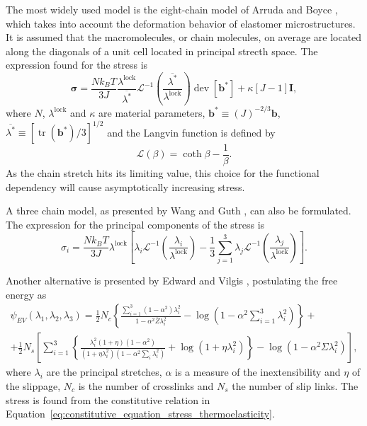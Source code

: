 The most widely used model is the eight-chain model of Arruda and Boyce \citep{arrudaEvolutionPlasticAnisotropy1993, arrudaEffectsStrainRate1995}, which takes into account the deformation behavior of elastomer microstructures.
It is assumed that the macromolecules, or chain molecules, on average are located along the diagonals of a unit cell located in principal strecth space.
The expression found for the stress is
\begin{equation}
	\label{eq:eigth_chain_model}
	\bm \sigma = \frac{Nk_BT}{3J} \frac{\lambda^\text{lock}}{\overline{\lambda^*}}\mathcal L^{-1}\left(\frac{\overline{\lambda^*}}{\lambda^\text{lock}}\right)\operatorname{dev} [\mathbf b^*] + \kappa [J-1]\mathbf I,
\end{equation}
where $N$, $\lambda^\text{lock}$ and $\kappa$ are material parameters, $\mathbf b^*\equiv (J)^{-2/3}\mathbf b$, $\overline{\lambda^*}\equiv [\operatorname{tr}(\mathbf b^*)/3]^{1/2}$ and the Langvin function is defined by
\begin{equation}
	\mathcal L(\beta) = \coth \beta - \frac{1}{\beta}.
\end{equation}
As the chain stretch hits its limiting value, this choice for the functional dependency will cause asymptotically increasing stress.

A three chain model, as presented by Wang and Guth \citep{wangStatisticalTheoryNetworks1952}, can also be formulated.
The expression for the principal components of the stress is
\begin{equation}
	\label{eq:three_chain_model}
	\sigma_i=\frac{Nk_B T}{3J} \lambda^\text{lock} \left[\lambda_i \mathcal L^{-1}\left(\frac{\lambda_i}{\lambda^\text{lock}}\right) - \frac{1}{3} \sum_{j=1}^3 \lambda_j \mathcal L^{-1}\left(\frac{\lambda_j}{\lambda^\text{lock}}\right)\right].
\end{equation}

Another alternative is presented by Edward and Vilgis \citep{edwardsEffectEntanglementsRubber1986}, postulating the free energy as
\begin{multline}
	\psi_{EV}(\lambda_1, \lambda_2, \lambda_3) = \frac{1}{2} N_c\left\{\frac{\sum_{i=1}^3\left(1-\alpha^2\right) \lambda_i^2}{1-\alpha^2 \bar{Z} \lambda_i^2}-\log \left(1-\alpha^2 \sum_{i=1}^3 \lambda_i^2\right)\right\}+ \\
	+\frac{1}{2} N_s\left[\sum_{i=1}^3\left\{\frac{\lambda_i^2(1+\eta)\left(1-\alpha^2\right)}{\left(1+\eta \lambda_i^2\right)\left(1-\alpha^2 \sum_i \lambda_i^2\right)}+\log \left(1+\eta \lambda_i^2\right)\right\}-\log \left(1-\alpha^2 \Sigma \lambda_i^2\right)\right],
\end{multline}
where $\lambda_i$ are the principal stretches, $\alpha$ is a measure of the inextensibility and $\eta$ of the slippage, $N_c$ is the number of crosslinks and $N_s$ the number of slip links.
The stress is found from the constitutive relation in Equation~\eqref{eq:constitutive_equation_stress_thermoelasticity}.

